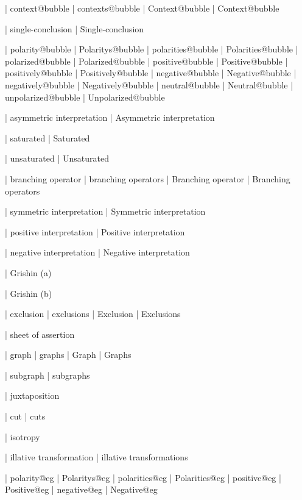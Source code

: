  | context@bubble
 | contexts@bubble
 | Context@bubble
 | Context@bubble

 | single-conclusion
 | Single-conclusion

 | polarity@bubble
 | Polaritys@bubble
 | polarities@bubble
 | Polarities@bubble
 | polarized@bubble
 | Polarized@bubble
 | positive@bubble
 | Positive@bubble
 | positively@bubble
 | Positively@bubble
 | negative@bubble
 | Negative@bubble
 | negatively@bubble
 | Negatively@bubble
 | neutral@bubble
 | Neutral@bubble
 | unpolarized@bubble
 | Unpolarized@bubble

 | asymmetric interpretation
 | Asymmetric interpretation

 | saturated
 | Saturated

 | unsaturated
 | Unsaturated

 | branching operator
 | branching operators
 | Branching operator
 | Branching operators
 
 | symmetric interpretation
 | Symmetric interpretation

 | positive interpretation
 | Positive interpretation

 | negative interpretation
 | Negative interpretation

 | Grishin (a)

 | Grishin (b)

 | exclusion
 | exclusions
 | Exclusion
 | Exclusions


 | sheet of assertion
 
 | graph
 | graphs
 | Graph
 | Graphs

 | subgraph
 | subgraphs

 | juxtaposition

 | cut
 | cuts

 | isotropy

 | illative transformation
 | illative transformations

 | polarity@eg
 | Polaritys@eg
 | polarities@eg
 | Polarities@eg
 | positive@eg
 | Positive@eg
 | negative@eg
 | Negative@eg

